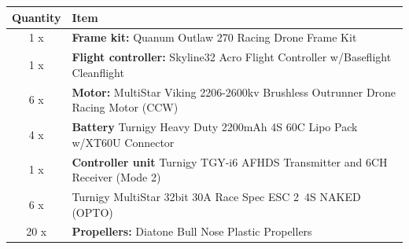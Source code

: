 \begin{table}[H]
\begin{tabular}{|c|l|}
\hline
\textbf{Quantity} & \textbf{Item} \\ \hline
1 x  & \textbf{Frame kit:} Quanum Outlaw 270 Racing Drone Frame Kit \\ \hline
1 x & \textbf{Flight controller:} Skyline32 Acro Flight Controller w/Baseflight  Cleanflight \\ \hline
6 x & \textbf{Motor:} MultiStar Viking 2206-2600kv Brushless Outrunner Drone Racing Motor (CCW) \\ \hline
4 x & \textbf{Battery} Turnigy Heavy Duty 2200mAh 4S 60C Lipo Pack w/XT60U Connector \\ \hline
1 x & \textbf{Controller unit} Turnigy TGY-i6 AFHDS Transmitter and 6CH Receiver (Mode 2) \\ \hline
6 x & Turnigy MultiStar 32bit 30A Race Spec ESC 2~4S NAKED (OPTO) \\ \hline
20 x & \textbf{Propellers:} Diatone Bull Nose Plastic Propellers \\ \hline
\end{tabular}
\end{table}